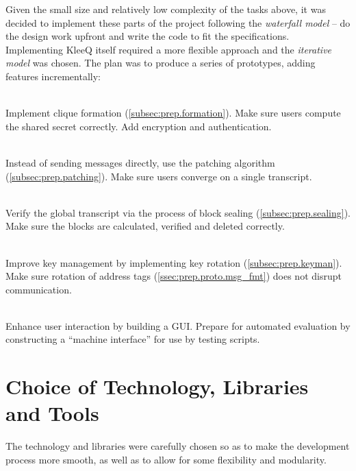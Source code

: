 \documentclass[a4paper, 12pt]{report}
\begin{document}
Given the small size and relatively low complexity of the tasks above, it was decided to implement these parts of the project following the \emph{waterfall model} -- do the design work upfront and write the code to fit the specifications. \\

Implementing KleeQ itself required a more flexible approach and the \emph{iterative model} was chosen. The plan was to produce a series of prototypes, adding features incrementally:
\begin{description}[labelindent=0.5cm, leftmargin=1.3cm, rightmargin=0.5cm]
    \item[Prototype 1: Clique Formation]\hfill \\
        Implement clique formation (\cref{subsec:prep.formation}). Make sure users compute the shared secret correctly. Add encryption and authentication.
    \item[Prototype 2: Patching]\hfill \\
        Instead of sending messages directly, use the patching algorithm (\cref{subsec:prep.patching}). Make sure users converge on a single transcript.
    \item[Prototype 3: Sealing]\hfill \\
        Verify the global transcript via the process of block sealing (\cref{subsec:prep.sealing}). Make sure the blocks are calculated, verified and deleted correctly.
    \item[Prototype 4: Key Management]\hfill \\
        Improve key management by implementing key rotation (\cref{subsec:prep.keyman}). Make sure rotation of address tags (\cref{ssec:prep.proto.msg_fmt}) does not disrupt communication.
    \item[Prototype 5: Interface] \hfill \\
        Enhance user interaction by building a GUI. Prepare for automated evaluation by constructing a ``machine interface'' for use by testing scripts. 
\end{description}

\section{Choice of Technology, Libraries and Tools}
The technology and libraries were carefully chosen so as to make the development process more smooth, as well as to allow for some flexibility and modularity.
\end{document}
